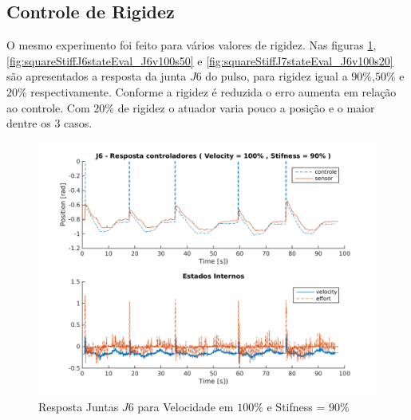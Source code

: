 %          

%          

\subsection{Controle de Rigidez}

O mesmo experimento foi feito para vários valores de rigidez. Nas figuras \ref{fig:squareStiffJ10stateEval_J6v100s90}, \ref{fig:squareStiffJ6stateEval_J6v100s50} e \ref{fig:squareStiffJ7stateEval_J6v100s20} são apresentados a resposta da junta $J6$ do pulso, para rigidez igual a $90\%$,$50\%$ e $20\%$ respectivamente. Conforme a rigidez é reduzida o erro aumenta em relação ao controle. Com $20\%$ de rigidez o atuador varia pouco a posição e o maior dentre os 3 casos.

\vspace{1cm}

\begin{figure}[H]
    \centering
    \includegraphics[width=0.6\linewidth,trim={2cm 1cm 2cm 2cm}]{tex/figs/squareStiffJ10stateEval_J6v100s90.png}
    \caption{Resposta Juntas $J6$ para Velocidade em $100\%$ e Stifness = $90\%$ }
    \label{fig:squareStiffJ10stateEval_J6v100s90}
\end{figure}

